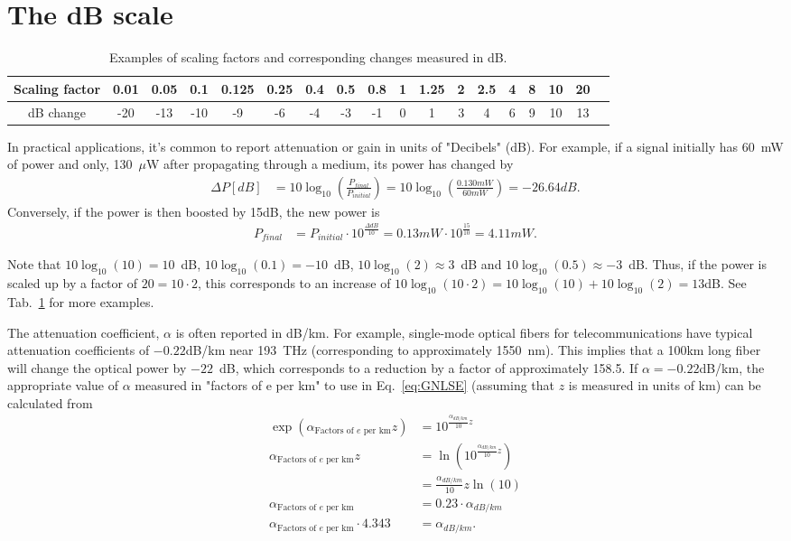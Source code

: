 \section{The dB scale}
\begin{table}[]
    \centering
    \begin{tabular}{ c|c|c|c|c|c|c|c|c|c|c|c|c|c|c|c|c|c }
\label{tab:dB}
 Scaling factor &0.01&0.05 & 0.1 &0.125 &0.25&0.4 &0.5 & 0.8&1&1.25 &2 &2.5 &4 &8 &10 &20 & \\  \hline
 dB change & -20 &-13 &-10 & -9&  -6&-4& -3&-1&0&1 &3 &4 &6 &9 & 10&13 
\end{tabular}
    \caption{Examples of scaling factors and corresponding changes measured in dB.}
    \label{tab:dB}
\end{table}
In practical applications, it's common to report attenuation or gain in units of "Decibels" (dB). For example, if a signal initially has 60~mW of power and only, 130~$\mu$W after propagating through a medium, its power has changed by
\begin{align}
    \Delta P [dB] &= 10 \log_{10}\left(\frac{P_{final}}{P_{initial}} \right)= 10 \log_{10}\left(\frac{0.130 mW}{60 mW} \right) = -26.64 dB.
\end{align}
Conversely, if the power is then boosted by 15dB, the new power is
\begin{align}
\label{eq:boost}
    P_{final}&=P_{initial}\cdot10^{\frac{\Delta dB}{10}}=0.13mW\cdot10^{\frac{15}{10}} = 4.11 mW.
\end{align}


Note that $10\log_{10}(10)=10$~dB, $10\log_{10}(0.1)=-10$~dB, $10\log_{10}(2)\approx3$~dB and $10\log_{10}(0.5)\approx-3$~dB. Thus, if the power is scaled up by a factor of $20=10\cdot 2$, this corresponds to an increase of $10\log_{10}(10\cdot 2) = 10\log_{10}(10)+10\log_{10}(2) = 13$dB. See Tab.~\ref{tab:dB} for more examples. 

The attenuation coefficient, $\alpha$ is often reported in dB/km. For example, single-mode optical fibers for telecommunications  have typical attenuation coefficients of $-0.22$dB/km near 193~THz (corresponding to approximately 1550~nm). This implies that a 100km long fiber will change the optical power by $-22$~dB, which corresponds to a reduction by a factor of approximately 158.5. If $\alpha=-0.22$dB/km, the appropriate value of $\alpha$ measured in "factors of e per km" to use in Eq.~\ref{eq:GNLSE} (assuming that $z$ is measured in units of km) can be calculated from
\begin{align}
    \exp\left(\alpha_{\text{Factors of $e$ per km}}z\right) &= 10^{ \frac{\alpha_{dB/km}}{10}z} \\ \nonumber
    \alpha_{\text{Factors of $e$ per km}}z &= \ln\left(10^{ \frac{\alpha_{dB/km}}{10}z} \right)\\ \nonumber
    &= \frac{\alpha_{dB/km}}{10}z \ln(10)\\ \nonumber
    \alpha_{\text{Factors of $e$ per km}} &= 0.23\cdot \alpha_{dB/km}\\ \nonumber
    \alpha_{\text{Factors of $e$ per km}}\cdot4.343&=\alpha_{dB/km}.
\end{align}


